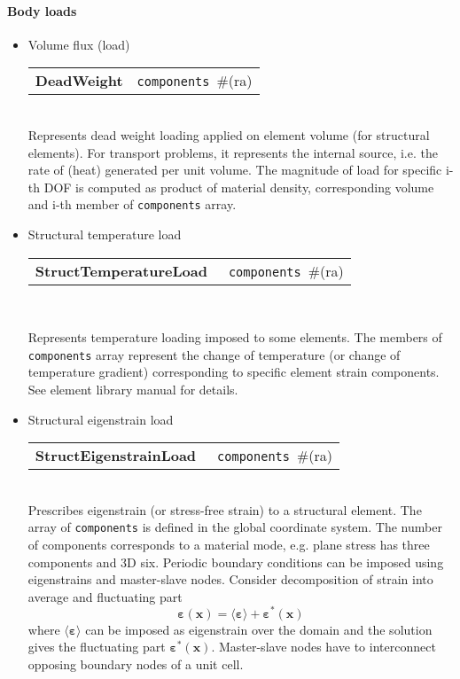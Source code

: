 \documentclass[a4paper]{article}
\newcommand{\vect}[1]{\boldsymbol{#1}} %
\newcommand{\tens}[1]{\boldsymbol{#1}} %
\newcommand{\strain}{\varepsilon}
\newcommand{\param}[1]{\texttt{#1}} %
\newcommand{\field}[2]{\param{#1}~\#{\tiny(#2)}} %
\newcommand{\entKeywordInst}[1]{\textbf{#1}} %
\newenvironment{record}[1][]{\begin{tabular}{|ll}}{\end{tabular}\\}
\newcommand{\recentry}[2]{{#1}&{#2}\\}
\newcounter{rcc}
\newenvironment{record}[1][\textwidth]{\setcounter{rcc}{0}\rowcolors{1}{lightgray}{lightgray}\tabularx{#1}{llR} \hline}
               {\endtabularx}
\newcommand{\recentry}[2]{\ifthenelse{\value{rcc}>0}{$\backslash$ \\}{\setcounter{rcc}{1}}{#1}&{#2}&}
\begin{document}
\paragraph{Body loads}
\begin{itemize}
\item Volume flux (load)

\noindent
\begin{record}[0.9\textwidth]
  \recentry{\entKeywordInst{DeadWeight}}{\field{components}{ra}}
\end{record}
Represents dead weight loading applied on element volume (for
structural elements). For transport problems, it represents the
internal source, i.e. the rate of (heat) generated per unit volume.
The magnitude of load for specific i-th DOF is computed as product of material density,
corresponding volume and i-th member of \param{components} array.
\item Structural temperature load

\noindent
\begin{record}[0.9\textwidth]
  \recentry{\entKeywordInst{StructTemperatureLoad}~}{\field{components}{ra}}
\end{record}

Represents temperature loading imposed to some elements. The members of
\param{components} array represent the change of temperature (or change
of temperature gradient) corresponding to
specific element strain components. See element library manual for details.

\item Structural eigenstrain load

\noindent
\begin{record}[0.9\textwidth]
  \recentry{\entKeywordInst{StructEigenstrainLoad}~}{\field{components}{ra}}
\end{record}
Prescribes eigenstrain (or stress-free strain) to a structural element. The array of \param{components} is defined in the global coordinate system. The number of components corresponds to a material mode, e.g. plane stress has three components and 3D six. Periodic boundary conditions can be imposed using eigenstrains and master-slave nodes. Consider decomposition of strain into average and fluctuating part
\begin{equation}
\tens{\strain}(\vect{x}) = \langle \tens{\strain} \rangle + \tens{\strain}^*(\vect{x})
\end{equation}
where $\langle \tens{\strain} \rangle$ can be imposed as eigenstrain over the domain and the solution gives the fluctuating part $\tens{\strain}^*(\vect{x})$. Master-slave nodes have to interconnect opposing boundary nodes of a unit cell.


\end{itemize}
\end{document}
